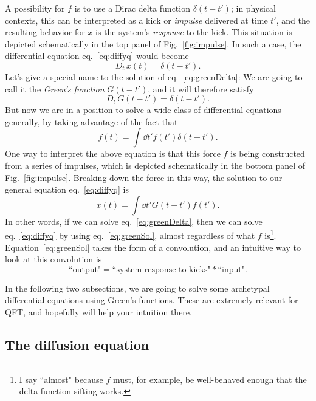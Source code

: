 A possibility for $f$ is to use a Dirac delta function
$\delta(t-t')$; in physical contexts, this can be interpreted as a 
kick or {\it impulse} delivered at time $t'$, and 
the resulting behavior for $x$ is the system's {\it response} 
to the kick. This situation is depicted schematically in the top panel of
Fig.~\ref{fig:impulse}. In such a case, the differential equation
eq.~\eqref{eq:diffyq} would become
\begin{equation}\label{eq:greenDelta}
  D_t\,x(t)=\delta(t-t').
\end{equation}
Let's give a special name to the solution of eq.~\eqref{eq:greenDelta}: We
are going to call it the {\it Green's function} $G(t-t')$, and it will
therefore satisfy
\begin{equation}\label{eq:greenDeltaSol}
  D_t\,G(t-t')=\delta(t-t').
\end{equation}
But now we are in a position to solve a wide class of differential equations
generally, by taking advantage of the fact that
\begin{equation}\label{eq:deltaSift}
  f(t)=\int\dd{t'}f(t')\delta(t-t').
\end{equation}
One way to interpret the above equation is that this force $f$ is being
constructed from a series of impulses, which is depicted schematically
in the bottom panel of Fig.~\ref{fig:impulse}. Breaking down the force
in this way, the solution to our general equation eq.~\eqref{eq:diffyq} is
\begin{equation}\label{eq:greenSol}
  x(t)=\int\dd{t'}G(t-t')f(t').
\end{equation}
In other words, if we can solve eq.~\eqref{eq:greenDelta}, then we can
solve eq.~\eqref{eq:diffyq} by using eq.~\eqref{eq:greenSol}, almost
regardless of what $f$ is\footnote{I say ``almost" because $f$ must, for
example, be well-behaved enough that the delta function sifting works.}.
Equation~\eqref{eq:greenSol} takes the form of a convolution, and an
intuitive way to look at this convolution is
\begin{equation}
  \text{``output"} = \text{``system response to kicks"} * \text{``input"}.
\end{equation}

In the following two subsections, we are going to solve some
archetypal differential equations using Green's functions. These are
extremely relevant for QFT, and hopefully will help your intuition there.

\subsection{The diffusion equation}

